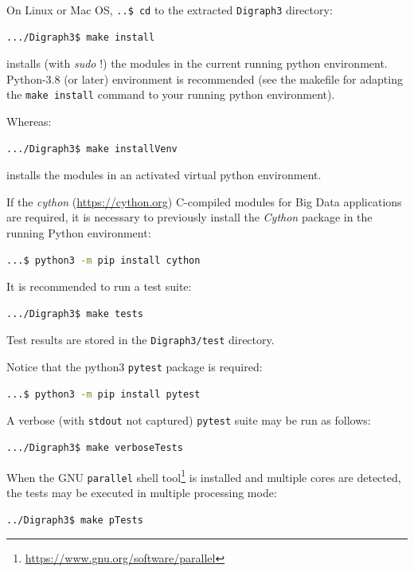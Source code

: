 \noindent On Linux or Mac OS, \texttt{..\$ cd} to the extracted \texttt{Digraph3} directory:
\begin{lstlisting}[language=sh, backgroundcolor=\color{White},numbers=none]
  .../Digraph3$ make install
\end{lstlisting}
installs (with \emph{sudo} !) the \Digraph modules in the current running python environment. Python-3.8 (or later) environment is recommended (see the makefile for adapting the \texttt{make install} command to your running python environment).

\noindent Whereas:
\begin{lstlisting}[language=sh, backgroundcolor=\color{White}, numbers=none]
  .../Digraph3$ make installVenv
\end{lstlisting}
installs the \Digraph modules in an activated virtual python environment.

If the \emph{cython} (\href{https://cython.org}{https://cython.org}) C-compiled modules for Big Data applications are required, it is necessary to previously install the \emph{Cython} package in the running Python environment:
\begin{lstlisting}[language=sh, backgroundcolor=\color{White}, numbers=none]
  ...$ python3 -m pip install cython
\end{lstlisting}
It is recommended to run a test suite:
\begin{lstlisting}[language=sh, backgroundcolor=\color{White}, numbers=none]
  .../Digraph3$ make tests
\end{lstlisting}
Test results are stored in the \texttt{Digraph3/test} directory.

\noindent Notice that the python3 \texttt{pytest} package is required:
\begin{lstlisting}[language=sh, backgroundcolor=\color{White}, numbers=none]
  ...$ python3 -m pip install pytest
\end{lstlisting}
A verbose (with \texttt{stdout} not captured) \texttt{pytest} suite may be run as follows:
\begin{lstlisting}[language=sh, backgroundcolor=\color{White}, numbers=none]
  .../Digraph3$ make verboseTests
\end{lstlisting}
When the GNU \texttt{parallel} shell tool\footnote{\href{https://www.gnu.org/software/parallel}{https://www.gnu.org/software/parallel}} is installed and multiple cores are detected, the tests may be executed in multiple processing mode:
\begin{lstlisting}[language=sh, backgroundcolor=\color{White}, numbers=none]
  ../Digraph3$ make pTests
\end{lstlisting}

